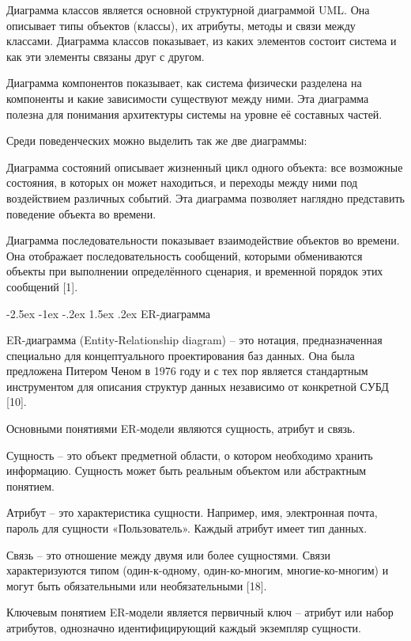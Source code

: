 \documentclass[14pt,a4paper]{extarticle}
\makeatletter
\renewcommand\subsubsection{%
  \@startsection{subsubsection}{3}{\z@}%
    {-2.5ex \@plus -1ex \@minus -.2ex}%
    {1.5ex \@plus .2ex}%
    {\centering\normalfont\normalsize\bfseries}%
}
\makeatother
\begin{document}
Диаграмма классов является основной структурной диаграммой UML. Она
описывает типы объектов (классы), их атрибуты, методы и связи между
классами. Диаграмма классов показывает, из каких элементов состоит
система и как эти элементы связаны друг с другом.

Диаграмма компонентов показывает, как система физически разделена на
компоненты и какие зависимости существуют между ними. Эта диаграмма
полезна для понимания архитектуры системы на уровне её составных частей.

Среди поведенческих можно выделить так же две диаграммы:

Диаграмма состояний описывает жизненный цикл одного объекта: все
возможные состояния, в которых он может находиться, и переходы между
ними под воздействием различных событий. Эта диаграмма позволяет
наглядно представить поведение объекта во времени.

Диаграмма последовательности показывает взаимодействие объектов во
времени. Она отображает последовательность сообщений, которыми
обмениваются объекты при выполнении определённого сценария, и временной
порядок этих сообщений [1].

\subsubsection{ER-диаграмма}

ER-диаграмма (Entity-Relationship diagram) -- это нотация,
предназначенная специально для концептуального проектирования баз
данных. Она была предложена Питером Ченом в 1976 году и с тех пор
является стандартным инструментом для описания структур данных
независимо от конкретной СУБД [10].

Основными понятиями ER-модели являются сущность, атрибут и связь.

Сущность -- это объект предметной области, о котором необходимо хранить
информацию. Сущность может быть реальным объектом или абстрактным
понятием.

Атрибут -- это характеристика сущности. Например, имя, электронная
почта, пароль для сущности «Пользователь». Каждый атрибут имеет тип
данных.

Связь -- это отношение между двумя или более сущностями. Связи
характеризуются типом (один-к-одному, один-ко-многим, многие-ко-многим)
и могут быть обязательными или необязательными [18].

Ключевым понятием ER-модели является первичный ключ -- атрибут или набор
атрибутов, однозначно идентифицирующий каждый экземпляр сущности.
\end{document}
